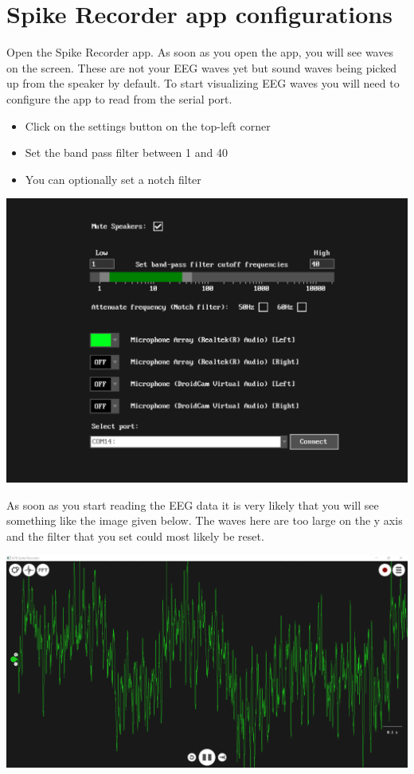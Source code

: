 \documentclass[
  letterpaper,
  DIV=11,
  numbers=noendperiod]{scrreprt}
\begin{document}
\section{Spike Recorder app
configurations}\label{spike-recorder-app-configurations}

Open the Spike Recorder app. As soon as you open the app, you will see
waves on the screen. These are not your EEG waves yet but sound waves
being picked up from the speaker by default. To start visualizing EEG
waves you will need to configure the app to read from the serial port.

\begin{itemize}
\item
  Click on the settings button on the top-left corner
\item
  Set the band pass filter between 1 and 40
\item
  You can optionally set a notch filter
\end{itemize}

\includegraphics{images/clipboard-1531367267.png}

As soon as you start reading the EEG data it is very likely that you
will see something like the image given below. The waves here are too
large on the y axis and the filter that you set could most likely be
reset.

\includegraphics{images/clipboard-531262790.png}
\end{document}
